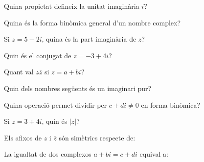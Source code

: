 \bigskip{}\par\medskip
{}
\begin{enumerate}
\pregunta Quina propietat defineix la unitat imaginària $i$?
\begin{enumerate}
\end{enumerate}\feedback
\pregunta Quina és la forma binòmica general d’un nombre complex?
\begin{enumerate}
\end{enumerate}\feedback
\pregunta Si $z=5-2i$, quina és la part imaginària de $z$?
\begin{enumerate}
\end{enumerate}\feedback
\pregunta Quin és el conjugat de $z=-3+4i$?
\begin{enumerate}
\end{enumerate}\feedback
\pregunta Quant val $z\overline z$ si $z=a+bi$?
\begin{enumerate}
\end{enumerate}\feedback
\pregunta Quin dels nombres següents és un imaginari pur?
\begin{enumerate}
\end{enumerate}\feedback
\pregunta Quina operació permet dividir per $c+di\ne0$ en forma binòmica?
\begin{enumerate}
\end{enumerate}\feedback
\pregunta Si $z=3+4i$, quin és $|z|$?
\begin{enumerate}
\end{enumerate}\feedback
\pregunta Els afixos de $z$ i $\overline z$ són simètrics respecte de:
\begin{enumerate}
\end{enumerate}\feedback
\pregunta La igualtat de dos complexos $a+bi=c+di$ equival a:
\begin{enumerate}
\end{enumerate}\feedback
\end{enumerate}
